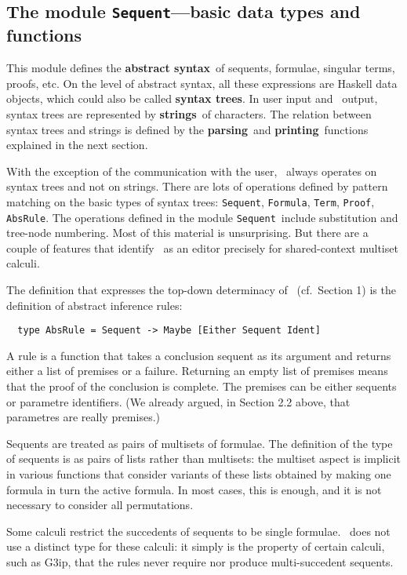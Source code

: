 \subsection{The module {\tt Sequent}---basic data types and functions}

This module defines the {\bf abstract syntax}\ of sequents, formulae, 
singular terms, proofs, etc. On the level of abstract syntax, all these
expressions are Haskell data objects, which could also be called
{\bf syntax trees}. In user input and \PESC\ output, syntax trees are represented by
{\bf strings}\ of characters. The relation between syntax trees and strings
is defined by the {\bf parsing}\ and {\bf printing}\ functions explained in 
the next section. 

With the exception of the communication with the user, \PESC\ always operates 
on syntax trees and not on strings. There are lots of operations defined by
pattern matching on the basic types of syntax trees: {\tt Sequent}, {\tt Formula},
{\tt Term}, {\tt Proof}, {\tt AbsRule}. %
The operations defined in the module {\tt Sequent}\ include substitution and
tree-node numbering. Most of this material is unsurprising. But there are a
couple of features that identify \PESC\ as an editor precisely for
shared-context multiset calculi.

The definition that expresses the top-down determinacy of \PESC\ (cf.\ Section 1)
is the definition of abstract inference rules:
\begin{verbatim}
  type AbsRule = Sequent -> Maybe [Either Sequent Ident]
\end{verbatim}
A rule is a function that takes a conclusion sequent as its argument and returns
either a list of premises or a failure. Returning an empty list of premises means
that the proof of the conclusion is complete. The premises can be either sequents 
or parametre identifiers. (We already argued, in Section 2.2 above, that parametres
are really premises.)

Sequents are treated as pairs of multisets of formulae. The definition of the 
type of sequents is as pairs of lists rather than multisets: the multiset aspect
is implicit in various functions that consider variants of these lists obtained by
making one formula in turn the active formula. In most cases, this is enough, and
it is not necessary to consider all permutations.

Some calculi restrict the succedents of sequents to be single formulae. \PESC\ does
not use a distinct type for these calculi: it simply is the property of certain 
calculi, such as G3ip, that the rules never require nor produce multi-succedent
sequents.



